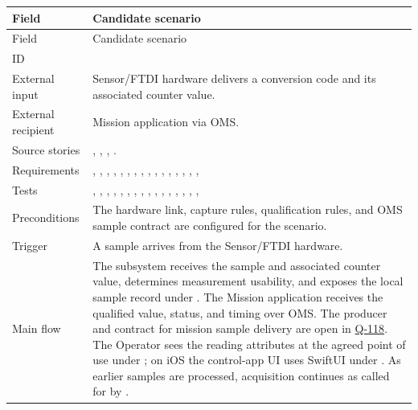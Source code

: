 \small
\begin{tabularx}{\linewidth}{L{2.8cm}Y}
\caption{Receive Qualified Sensor Samples\label{Table:UC-01}\label{Table:SensorUseCase}}\\
\toprule
Field & Candidate scenario\\\midrule
\endfirsthead
\toprule
Field & Candidate scenario\\\midrule
\endhead
\bottomrule
\endlastfoot
ID & \\
External input & Sensor/FTDI hardware delivers a conversion code and its associated counter value.\\
External recipient & Mission application via OMS.\\
Source stories & , , , .\\
Requirements & , , , , , , , , , , , , , , , , \\
Tests & , , , , , , , , , , , , , , , , \\
Preconditions & The hardware link, capture rules, qualification rules, and OMS sample contract are configured for the scenario.\\
Trigger & A sample arrives from the Sensor/FTDI hardware.\\
Main flow & The subsystem receives the sample and associated counter value, determines measurement usability, and exposes the local sample record under . The Mission application receives the qualified value, status, and timing over OMS. The producer and contract for mission sample delivery are open in \hyperref[Question:Q-118]{Q-118}. The Operator sees the reading attributes at the agreed point of use under ; on iOS the control-app UI uses SwiftUI under . As earlier samples are processed, acquisition continues as called for by .\\

\end{tabularx}
